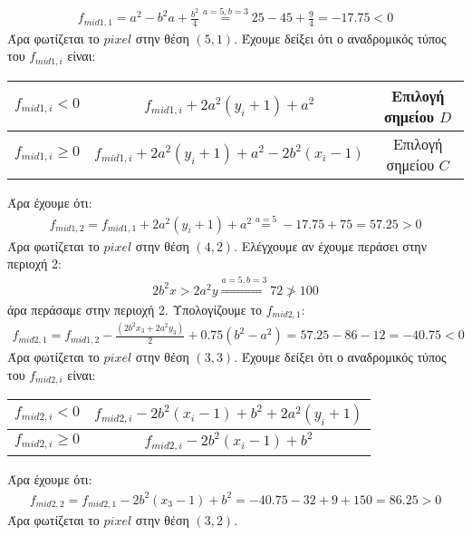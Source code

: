 \documentclass{article}
\begin{document}
\begin{align*}
    f_{mid1,1} = a^2 - b^2 a + \frac{b^2}{4} \overset{a=5,b=3}{=} 25 - 45 + \frac{9}{4}= -17.75 < 0 
\end{align*} 
Άρα φωτίζεται το $pixel$ στην θέση $(5,1)$. Έχουμε δείξει ότι ο αναδρομικός τύπος του $f_{mid1,i}$ είναι:
\begin{center}
    \begin{tabular}{ |c|c|c| } 
        \hline
        $f_{mid1,i}<0$ &$ f_{mid1,i} +2a^2 (y_{i}+1) + a^2$& Επιλογή σημείου $D$\\
        \hline
        $f_{mid1,i} \geq 0$ &$ f_{mid1,i} +2a^2 (y_{i}+1) + a^2 -2b^2(x_{i}-1)$& Επιλογή σημείου $C$\\
        \hline  
    \end{tabular}
\end{center}
Άρα έχουμε ότι:
\begin{align*}
     f_{mid1,2} = f_{mid1,1} + 2a^2 (y_{i}+1) + a^2 \overset{a=5}{=} -17.75 + 75 = 57.25 > 0 
\end{align*}
Άρα φωτίζεται το $pixel$ στην θέση $(4,2)$. Ελέγχουμε αν έχουμε περάσει στην περιοχή 2:
\begin{align*}
     2b^2x > 2a^2y \overset{a=5,b=3}{\Rightarrow} 72\ngtr100 
\end{align*}
άρα περάσαμε στην περιοχή 2. Υπολογίζουμε το $f_{mid2,1}$:
\begin{align*}
    f_{mid2,1} = f_ {mid1,2} - \frac {(2b^ {2}x_ {3}+2a^ {2}y_ {3})}{2}  +0.75(  b^ {2}  -  a^ {2} ) = 57.25 - 86 -12 = -40.75 < 0 
\end{align*}
Άρα φωτίζεται το $pixel$ στην θέση $(3,3)$. Έχουμε δείξει ότι ο αναδρομικός τύπος του $f_{mid2,i}$ είναι:
\begin{center}
    \begin{tabular}{ |c|c| } 
        \hline
        $f_{mid2,i}<0$ &$ f_{mid2,i} -2b^2 (x_{i}-1) + b^2 + 2a^2 (y_{i}+1)$\\
        \hline
        $f_{mid2,i} \geq 0$ &$ f_{mid2,i} -2b^2 (x_{i}-1) + b^2 $\\
        \hline  
    \end{tabular}
\end{center}
Άρα έχουμε ότι:
\begin{align*}
   f_{mid2,2} = f_{mid2,1} -2b^2 (x_{3}-1) + b^2 = -40.75 - 32 +9 + 150 = 86.25 > 0 
\end{align*}
Άρα φωτίζεται το $pixel$ στην θέση $(3,2)$.
\end{document}
